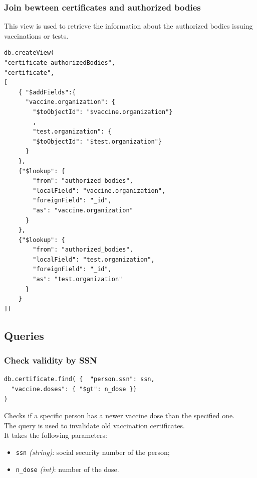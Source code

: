 \documentclass[12pt, a4paper]{article}
\begin{document}
\subsubsection{Join bewteen certificates and authorized bodies}
This view is used to retrieve the information about the authorized bodies issuing 
vaccinations or tests.
\begin{tcolorbox}[fontupper=\scriptsize]
    \begin{verbatim}
db.createView(
"certificate_authorizedBodies", 
"certificate", 
[
	{ "$addFields":{
	  "vaccine.organization": {
	    "$toObjectId": "$vaccine.organization"}
	    ,  
	    "test.organization": {
	    "$toObjectId": "$test.organization"}
	  }
	},
	{"$lookup": {
	    "from": "authorized_bodies",
	    "localField": "vaccine.organization",
	    "foreignField": "_id",
	    "as": "vaccine.organization"
	  }
	},
	{"$lookup": {
	    "from": "authorized_bodies",
	    "localField": "test.organization",
	    "foreignField": "_id",
	    "as": "test.organization"
	  }
	}
])
    \end{verbatim}
\end{tcolorbox}

\subsection{Queries}

\subsubsection{Check validity by SSN}
\begin{tcolorbox}[fontupper=\scriptsize]
    \begin{verbatim}
db.certificate.find( {  "person.ssn": ssn,
  "vaccine.doses": { "$gt": n_dose }}
)
    \end{verbatim}
\end{tcolorbox}

\noindent %
Checks if a specific person has a newer vaccine dose than the specified one. \\
The query is used to invalidate old vaccination certificates. \\
It takes the following parameters:
\begin{itemize}
    \item \texttt{ssn} \emph{(string)}: social security number of the person;
    \item \texttt{n\_dose} \emph{(int)}: number of the dose.
\end{itemize}
		
\end{document}
